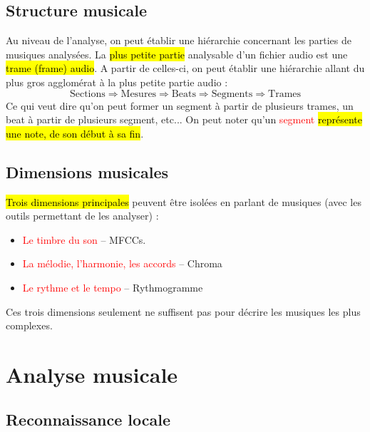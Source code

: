 \documentclass[letterpaper, 12pt]{article}
\newcommand{\alinea}{
\hspace*{0.5cm}}
\newcommand{\red}[1]{
	\textcolor{red}{#1}}
\begin{document}
		\subsection{Structure musicale}
			\alinea Au niveau de l'analyse, on peut établir une hiérarchie concernant les parties de musiques analysées.
				La \hl{plus petite partie} analysable d'un fichier audio est une \hl{trame (frame) audio}. 
				A partir de celles-ci, on peut établir une hiérarchie allant du plus gros agglomérat à la plus petite partie audio : 
				$$ \text{Sections} \Rightarrow \text{Mesures} \Rightarrow  \text{Beats} 
				        \Rightarrow \text{Segments} \Rightarrow \text{Trames} $$
				Ce qui veut dire qu'on peut former un segment à partir de plusieurs trames, un beat à partir de plusieurs segment, etc...
				On peut noter qu'un \red{segment} \hl{représente une note, de son début à sa fin}.
		\subsection{Dimensions musicales}
			\alinea \hl{Trois dimensions principales} peuvent être isolées en parlant de musiques 
				(avec les outils permettant de les analyser) : 
			\begin{itemize}
				\setlength\itemsep{0cm}
				\item \red{Le timbre du son} -- MFCCs.
				\item \red{La mélodie, l'harmonie, les accords} -- Chroma
				\item \red{Le rythme et le tempo} -- Rythmogramme
			\end{itemize}
			Ces trois dimensions seulement ne suffisent pas pour décrire les musiques les plus complexes.
	\section{Analyse musicale} 
		\subsection{Reconnaissance locale}
\end{document}
